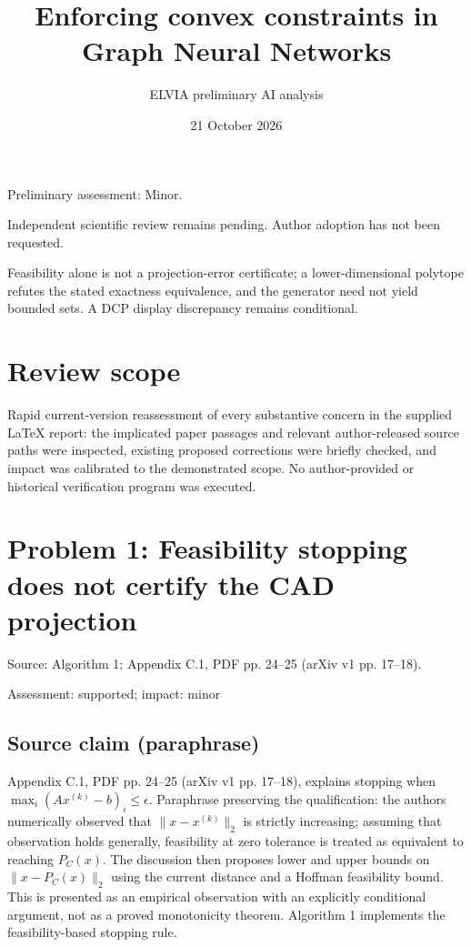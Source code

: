 \documentclass[11pt]{article}
\begin{document}
\title{Enforcing convex constraints in Graph Neural Networks}

\author{ELVIA preliminary AI analysis}\date{21 October 2026}\maketitle

Preliminary assessment: Minor.\par

Independent scientific review remains pending. Author adoption has not been requested.

Feasibility alone is not a projection-error certificate; a lower-dimensional polytope refutes the stated exactness equivalence, and the generator need not yield bounded sets. A DCP display discrepancy remains conditional.

\section*{Review scope}

Rapid current-version reassessment of every substantive concern in the supplied LaTeX report: the implicated paper passages and relevant author-released source paths were inspected, existing proposed corrections were briefly checked, and impact was calibrated to the demonstrated scope. No author-provided or historical verification program was executed.

\section*{Problem 1: Feasibility stopping does not certify the CAD projection}

Source: Algorithm 1; Appendix C.1, PDF pp. 24–25 (arXiv v1 pp. 17–18).

Assessment: supported; impact: minor

\subsection*{Source claim (paraphrase)}

Appendix C.1, PDF pp. 24–25 (arXiv v1 pp. 17–18), explains stopping when \(\max_i(Ax^{(k)}-b)_i\le\epsilon\). Paraphrase preserving the qualification: the authors numerically observed that \(\|x-x^{(k)}\|_2\) is strictly increasing; assuming that observation holds generally, feasibility at zero tolerance is treated as equivalent to reaching \(P_C(x)\). The discussion then proposes lower and upper bounds on \(\|x-P_C(x)\|_2\) using the current distance and a Hoffman feasibility bound. This is presented as an empirical observation with an explicitly conditional argument, not as a proved monotonicity theorem. Algorithm 1 implements the feasibility-based stopping rule.
\end{document}
